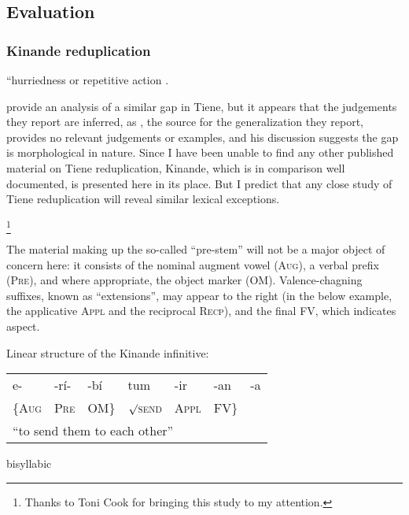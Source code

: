 \subsection{Evaluation}



\citet{Orgun1999}
\citet{Orgun2009}

\citet{Ito1989b}

\subsubsection{Kinande reduplication}

``hurriedness or repetitive action \citep[][85; henceforth, MH]{Mutaka1990}.

\citet{Orgun1999} provide an analysis of a similar gap in Tiene, but it appears that the judgements they report are inferred, as \citet{Ellington1977}, the source for the generalization they report, provides no relevant judgements or examples, and his discussion suggests the gap is morphological in nature.
Since I have been unable to find any other published material on Tiene reduplication, Kinande, which is in comparison well documented, is presented here in its place.
But I predict that any close study of Tiene reduplication will reveal similar lexical exceptions.

\footnote{Thanks to Toni Cook for bringing this study to my attention.}

The material making up the so-called ``pre-stem'' will not be a major object of concern here: it consists of the nominal augment vowel (\textsc{Aug}), a verbal prefix (\textsc{Pre}), and where appropriate, the object marker (\textsc{OM}). Valence-chagning suffixes, known as ``extensions'', may appear to the right (in the below example, the applicative \textsc{Appl} and the reciprocal \textsc{Recp}), and the final \textsc{FV}, which indicates aspect. 

\ex Linear structure of the Kinande infinitive: \\
\begin{tabular}{l l l l l l l}
e- & -rí- & -bí & tum & -ir & -an & -a \\
\{\textsc{Aug} & \textsc{Pre} & \textsc{OM}\} & $\surd$\textsc{send} & \textsc{Appl} & \textsc{FV}\} \\
\multicolumn{7}{l}{``to send them to each other''}
\end{tabular}
\xe

bisyllabic
\citet{Downing2000}

